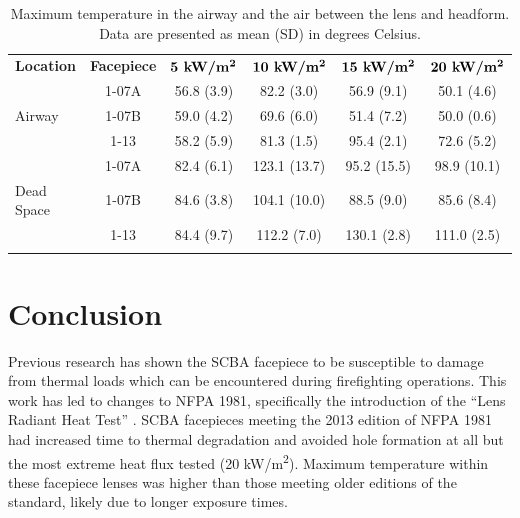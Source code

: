 \documentclass[sn-mathphys]{sn-jnl}%
\theoremstyle{thmstyleone}%
\theoremstyle{thmstyletwo}%
\theoremstyle{thmstylethree}%
\begin{document}
\begin{table}[h!]
\begin{center}

\caption{Maximum temperature in the airway and the air between the lens and headform. Data are presented as mean (SD) in degrees Celsius.}\label{tab3}

    \begin{tabular}{lccccc}
      \toprule
      \textbf{Location} & \textbf{Facepiece} & $\textbf{5 kW/m\textsuperscript{2}}$ & $\textbf{10 kW/m\textsuperscript{2}}$ & $\textbf{15 kW/m\textsuperscript{2}}$& $\textbf{20 kW/m\textsuperscript{2}}$\\
      \botrule
      & 1-07A & 56.8 (3.9) & 82.2 (3.0) & 56.9 (9.1) & 50.1 (4.6)\\ 
      \cmidrule{2-6}
      Airway & 1-07B & 59.0 (4.2) & 69.6 (6.0) & 51.4 (7.2) & 50.0 (0.6)\\ 
      \cmidrule{2-6}
      & 1-13 & 58.2 (5.9) & 81.3 (1.5) & 95.4 (2.1) & 72.6 (5.2)\\ 
      \botrule

        & 1-07A & 82.4 (6.1) & 123.1 (13.7) & 95.2 (15.5) & 98.9 (10.1)\\ 
      \cmidrule{2-6}
      Dead Space & 1-07B & 84.6 (3.8) & 104.1 (10.0) & 88.5 (9.0) & 85.6 (8.4)\\ 
      \cmidrule{2-6}
      & 1-13 & 84.4 (9.7) & 112.2 (7.0) & 130.1 (2.8) & 111.0 (2.5) \\ 
      \botrule


     
    \end{tabular}
  
  \end{center}
\end{table}

\section{Conclusion}
Previous research has shown the SCBA facepiece to be susceptible to damage from thermal loads which can be encountered during firefighting operations. This work has led to changes to NFPA 1981, specifically the introduction of the “Lens Radiant Heat Test” \cite{national_fire_protection_association_nfpa_2013}. SCBA facepieces meeting the 2013 edition of NFPA 1981 had increased time to thermal degradation and avoided hole formation at all but the most extreme heat flux tested (20 kW/m\textsuperscript{2}). Maximum temperature within these facepiece lenses was higher than those meeting older editions of the standard, likely due to longer exposure times. 
\end{document}
